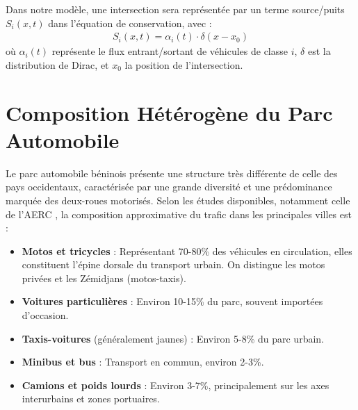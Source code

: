 \begin{theorem}
Dans notre modèle, une intersection sera représentée par un terme source/puits $S_i(x,t)$ dans l'équation de conservation, avec :
\begin{align}
S_i (x,t) = \alpha_i (t) \cdot \delta(x-x_0)
\end{align}
où $\alpha_i(t)$ représente le flux entrant/sortant de véhicules de classe $i$, $\delta$ est la distribution de Dirac, et $x_0$ la position de l'intersection.
\end{theorem}

\section{Composition Hétérogène du Parc Automobile}
\label{sec:composition_parc}

Le parc automobile béninois présente une structure très différente de celle des pays occidentaux, caractérisée par une grande diversité et une prédominance marquée des deux-roues motorisés. Selon les études disponibles, notamment celle de l'AERC \cite{aerc2019taxi}, la composition approximative du trafic dans les principales villes est :

\begin{itemize}
    \item \textbf{Motos et tricycles} : Représentant 70-80\% des véhicules en circulation, elles constituent l'épine dorsale du transport urbain. On distingue les motos privées et les Zémidjans (motos-taxis).
    \item \textbf{Voitures particulières} : Environ 10-15\% du parc, souvent importées d'occasion.
    \item \textbf{Taxis-voitures} (généralement jaunes) : Environ 5-8\% du parc urbain.
    \item \textbf{Minibus et bus} : Transport en commun, environ 2-3\%.
    \item \textbf{Camions et poids lourds} : Environ 3-7\%, principalement sur les axes interurbains et zones portuaires.
\end{itemize}

